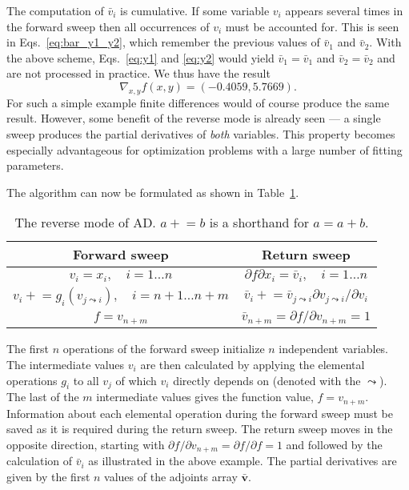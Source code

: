 \documentclass{article}
\begin{document}
The computation of $\bar v_i$ is cumulative. If some variable $v_i$ appears several times in the forward sweep then all occurrences of $v_i$ must be accounted for. This is seen in Eqs.~\eqref{eq:bar_y1_y2}, which remember the previous values of $\bar v_1$ and $\bar v_2$. With the above scheme, Eqs.~\eqref{eq:y1} and \eqref{eq:y2} would yield $\bar v_1 = \bar v_1$ and $\bar v_2 = \bar v_2$ and are not processed in practice. We thus have the result
\begin{equation}
  \label{eq:Fgrad}
  \nabla_{x,y} f(x,y) = (-0.4059,5.7669).
\end{equation}
For such a simple example finite differences would of course produce the same result. However, some benefit of the reverse mode is already seen --- a single sweep produces the partial derivatives of \textit{both} variables. This property becomes especially advantageous for optimization problems with a large number of fitting parameters.

The algorithm can now be formulated as shown in Table~\ref{tab:AD}.
\begin{table}[h]
  \centering
  \caption{The reverse mode of AD. $a\mathrel{+}=b$ is a shorthand for
    $a = a + b$.}
  \begin{tabular}{c|c}
    Forward sweep & Return sweep \\ \hline
    $v_i = x_i, \quad i=1\ldots n$ & $\partial f\partial x_i = \bar
                                     v_i, \quad i=1\ldots n$ \\
    $v_i \mathrel{+}= g_i(v_{j \leadsto i}), \quad i=n+1\ldots n+m$
                  & $\bar v_i \mathrel{+}= \bar v_{j \leadsto
                    i} \partial v_{j \leadsto i}/\partial v_i$ \\
    $f = v_{n+m}$ & $\bar v_{n+m} = \partial f/\partial v_{n+m} = 1$
  \end{tabular}
  \label{tab:AD}
\end{table}
The first $n$ operations of the forward sweep initialize $n$ independent variables. The intermediate values $v_i$ are then calculated by applying the elemental operations $g_i$ to all $v_j$ of which $v_i$ directly depends on (denoted with the $\leadsto$). The last of the $m$ intermediate values gives the function value, $f = v_{n+m}$. Information about each elemental operation during the forward sweep must be saved as it is required during the return sweep. The return sweep moves in the opposite direction, starting with $\partial f/\partial v_{n+m} = \partial f/\partial f = 1$ and followed by the calculation of $\bar v_i$ as illustrated in the above example. The partial derivatives are given by the first $n$ values of the adjoints array $\bm{\bar v}$.
\end{document}
